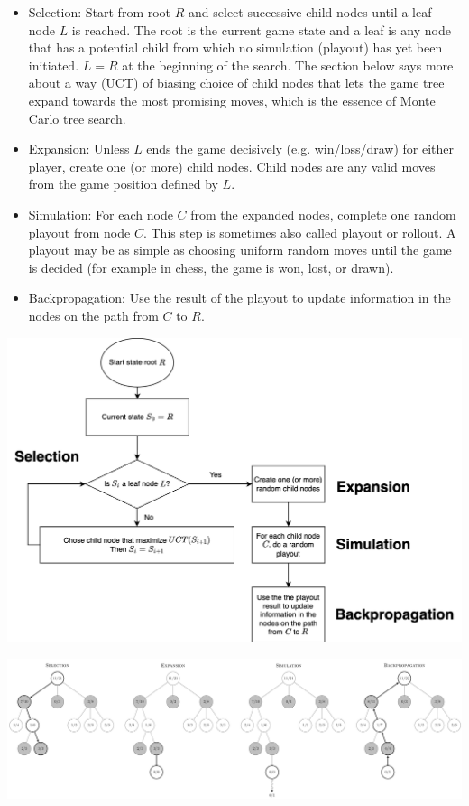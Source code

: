 \documentclass{article}
\begin{document}
\begin{itemize}
    \item Selection: Start from root \(R\) and select successive child nodes until a leaf node \(L\) is reached. The root is the current game state and a leaf is any node that has a potential child from which no simulation (playout) has yet been initiated. \(L = R\) at the beginning of the search. The section below says more about a way (UCT) of biasing choice of child nodes that lets the game tree expand towards the most promising moves, which is the essence of Monte Carlo tree search.
    \item Expansion: Unless \(L\) ends the game decisively (e.g. win/loss/draw) for either player, create one (or more) child nodes. Child nodes are any valid moves from the game position defined by \(L\).
    \item Simulation: For each node \(C\) from the expanded nodes, complete one random playout from node \(C\). This step is sometimes also called playout or rollout. A playout may be as simple as choosing uniform random moves until the game is decided (for example in chess, the game is won, lost, or drawn).
    \item Backpropagation: Use the result of the playout to update information in the nodes on the path from \(C\) to \(R\).
\end{itemize}

\begin{center}
    \includegraphics[scale=0.2]{./images/mcts_flow.png}
\end{center}

\begin{center}
\includegraphics[scale=0.1]{./images/mcts_steps.png}
\end{center}
\end{document}

